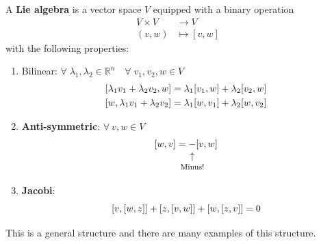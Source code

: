 \documentclass[../main.tex]{subfiles}
\begin{document}
\begin{definition}
A \textbf{Lie algebra} is a vector space $V$ equipped with a binary operation
\[
\begin{split}
    V\times V &\to V\\
    (v,w) &\mapsto [v,w]
\end{split}
\]
with the following properties:
\begin{enumerate}\renewcommand{\labelenumi}{(L\arabic{enumi})}
    \item Bilinear: $\forall \; \lambda_1,\lambda_2 \in \mathbb{R}^n \quad \forall\; v_1,v_2,w \in V$
    \[
    \begin{split}
        \comm{\lambda_1v_1+\lambda_2v_2}{w}&=\lambda_1\comm{v_1}{w}+\lambda_2\comm{v_2}{w}\\
        \comm{w}{\lambda_1v_1+\lambda_2v_2}&=\lambda_1\comm{w}{v_1}+\lambda_2\comm{w}{v_2}
    \end{split}
    \]
    \item \textbf{Anti-symmetric}: $\forall \ v,w\in V$
    \[
    \comm{w}{v}=\underset{\mathclap{\tikz \node {$\uparrow$} node [below=1ex] {\footnotesize Minus!};}}{-}\comm{v}{w}
    \]
    \item \textbf{Jacobi}:
    \[
    \comm{v}{\comm{w}{z}}+\comm{z}{\comm{v}{w}}+\comm{w}{\comm{z}{v}}=0
    \]
\end{enumerate}
\end{definition}
This is a general structure and there are many examples of this structure.
\end{document}

